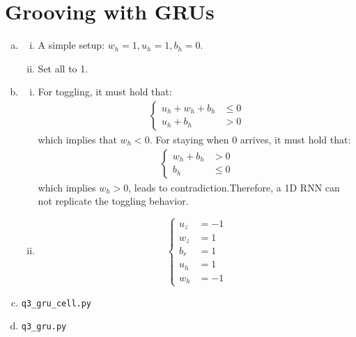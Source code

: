 \documentclass{article}[11pt]
\begin{document}
\section{Grooving with GRUs}
\begin{enumerate}[(a)]
\item 
  \begin{enumerate}[i.]
  \item A simple setup: $w_h = 1, u_h = 1, b_h = 0$.
  \item Set all to 1.
  \end{enumerate}
\item
  \begin{enumerate}[i.]
  \item For toggling, it must hold that:
    \begin{align*}
      \begin{cases}
        u_h + w_h + b_h &\leq 0 \\
        u_h + b_h & > 0
      \end{cases}
    \end{align*}
    which implies that $w_h < 0$.
    For staying when 0 arrives, it must hold that:
    \begin{align*}
      \begin{cases}
        w_h + b_h &> 0 \\
        b_h &\leq 0
      \end{cases}
    \end{align*}
    which implies $w_h > 0$, leads to contradiction.Therefore, a 1D RNN can not
    replicate the toggling behavior.
  \item
    \[
      \begin{cases}
        u_z &= -1\\
        w_z &= 1\\
        b_r &= 1\\
        u_h &= 1\\
        w_h &= -1
      \end{cases}
    \]
  \end{enumerate}
\item \verb|q3_gru_cell.py|
\item \verb|q3_gru.py| \\
  \begin{figure}[H]
    \begin{minipage}{0.5\linewidth}
      \begin{center}

\end{center}
\end{minipage}
\end{figure}
\end{enumerate}
\end{document}
